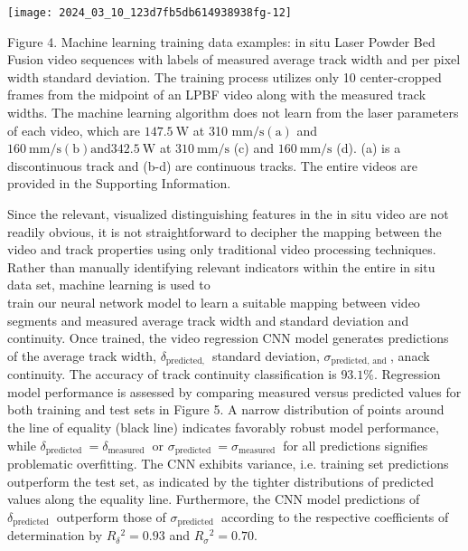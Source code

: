 \documentclass[10pt]{article}
\begin{document}
\begin{center}
\texttt{[image: 2024\_03\_10\_123d7fb5db614938938fg-12]}
\end{center}

Figure 4. Machine learning training data examples: in situ Laser Powder Bed Fusion video sequences with labels of measured average track width and per pixel width standard deviation. The training process utilizes only 10 center-cropped frames from the midpoint of an LPBF video along with the measured track widths. The machine learning algorithm does not learn from the laser parameters of each video, which are $147.5 \mathrm{~W}$ at 310 $\mathrm{mm} / \mathrm{s} \mathrm{(a)}$ and $160 \mathrm{~mm} / \mathrm{s} \mathrm{(b)} \mathrm{and} 342.5 \mathrm{~W}$ at $310 \mathrm{~mm} / \mathrm{s}$ (c) and $160 \mathrm{~mm} / \mathrm{s}$ (d). (a) is a discontinuous track and (b-d) are continuous tracks. The entire videos are provided in the Supporting Information.

Since the relevant, visualized distinguishing features in the in situ video are not readily obvious, it is not straightforward to decipher the mapping between the video and track properties using only traditional video processing techniques. Rather than manually identifying relevant indicators within the entire in situ data set, machine learning is used to\\
train our neural network model to learn a suitable mapping between video segments and measured average track width and standard deviation and continuity. Once trained, the video regression CNN model generates predictions of the average track width, $\delta_{\text {predicted, }}$ standard deviation, $\sigma_{\text {predicted, and }}$, anack continuity. The accuracy of track continuity classification is $93.1 \%$. Regression model performance is assessed by comparing measured versus predicted values for both training and test sets in Figure 5. A narrow distribution of points around the line of equality (black line) indicates favorably robust model performance, while $\delta_{\text {predicted }}=\delta_{\text {measured }}$ or $\sigma_{\text {predicted }}=\sigma_{\text {measured }}$ for all predictions signifies problematic overfitting. The CNN exhibits variance, i.e. training set predictions outperform the test set, as indicated by the tighter distributions of predicted values along the equality line. Furthermore, the CNN model predictions of $\delta_{\text {predicted }}$ outperform those of $\sigma_{\text {predicted }}$ according to the respective coefficients of determination by $R_{\delta}{ }^{2}=0.93$ and $R_{\sigma}{ }^{2}=0.70$.
\end{document}
